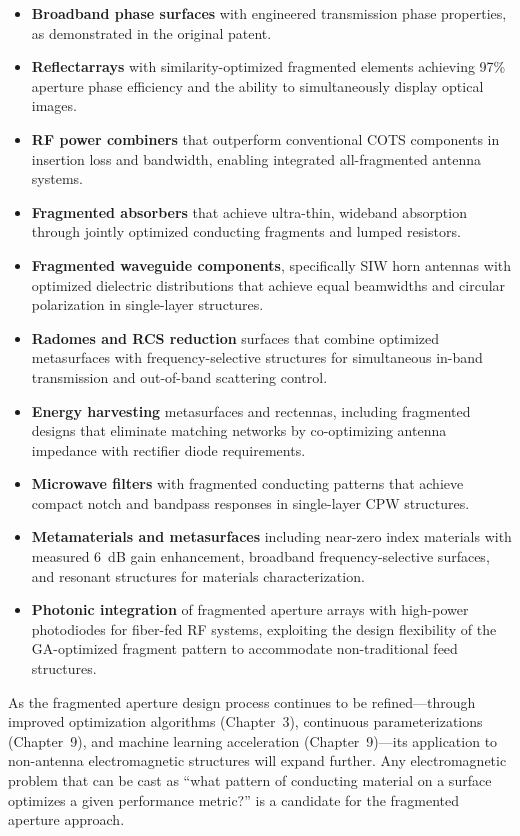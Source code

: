 \begin{itemize}
\item \textbf{Broadband phase surfaces} with engineered transmission phase properties, as demonstrated in the original patent.
\item \textbf{Reflectarrays} with similarity-optimized fragmented elements achieving 97\% aperture phase efficiency and the ability to simultaneously display optical images.
\item \textbf{RF power combiners} that outperform conventional COTS components in insertion loss and bandwidth, enabling integrated all-fragmented antenna systems.
\item \textbf{Fragmented absorbers} that achieve ultra-thin, wideband absorption through jointly optimized conducting fragments and lumped resistors.
\item \textbf{Fragmented waveguide components}, specifically SIW horn antennas with optimized dielectric distributions that achieve equal beamwidths and circular polarization in single-layer structures.
\item \textbf{Radomes and RCS reduction} surfaces that combine optimized metasurfaces with frequency-selective structures for simultaneous in-band transmission and out-of-band scattering control.
\item \textbf{Energy harvesting} metasurfaces and rectennas, including fragmented designs that eliminate matching networks by co-optimizing antenna impedance with rectifier diode requirements.
\item \textbf{Microwave filters} with fragmented conducting patterns that achieve compact notch and bandpass responses in single-layer CPW structures.
\item \textbf{Metamaterials and metasurfaces} including near-zero index materials with measured 6~dB gain enhancement, broadband frequency-selective surfaces, and resonant structures for materials characterization.
\item \textbf{Photonic integration} of fragmented aperture arrays with high-power photodiodes for fiber-fed RF systems, exploiting the design flexibility of the GA-optimized fragment pattern to accommodate non-traditional feed structures.
\end{itemize}

As the fragmented aperture design process continues to be refined---through improved optimization algorithms (Chapter~3), continuous parameterizations (Chapter~9), and machine learning acceleration (Chapter~9)---its application to non-antenna electromagnetic structures will expand further.  Any electromagnetic problem that can be cast as ``what pattern of conducting material on a surface optimizes a given performance metric?'' is a candidate for the fragmented aperture approach.


\FloatBarrier



